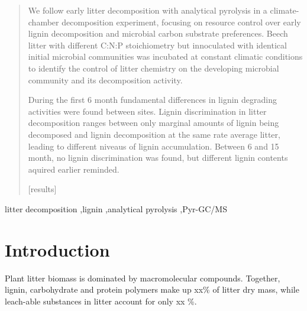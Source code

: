 \documentclass[authoryear,preprint,review,12pt]{elsarticle}
\begin{document}
\begin{frontmatter}
\begin{abstract}
We follow early litter decomposition with analytical pyrolysis in a climate-chamber decomposition experiment, focusing on resource control over early lignin decomposition and microbial carbon substrate preferences. Beech litter with different C:N:P stoichiometry but innoculated with identical initial microbial communities was incubated at constant climatic conditions to identify the control of litter chemistry on the developing microbial community and its decomposition activity. 

During the first 6 month fundamental differences in lignin degrading activities were found between sites. Lignin discrimination in litter decomposition ranges between only marginal amounts of lignin being decomposed and lignin decomposition at the same rate average litter, leading to different niveaus of lignin accumulation. Between 6 and 15 month, no lignin discrimination was found, but different lignin contents aquired earlier reminded.

[results]

\end{abstract}
\begin{keyword}
 litter decomposition \sep lignin \sep analytical pyrolysis \sep Pyr-GC/MS

\end{keyword}
\end{frontmatter}

\linenumbers
\section{Introduction}
Plant litter biomass is dominated by macromolecular compounds. Together, lignin, carbohydrate and protein polymers make up xx\% of litter dry mass, while leach-able substances in litter account for only xx \%. 
\end{document}

